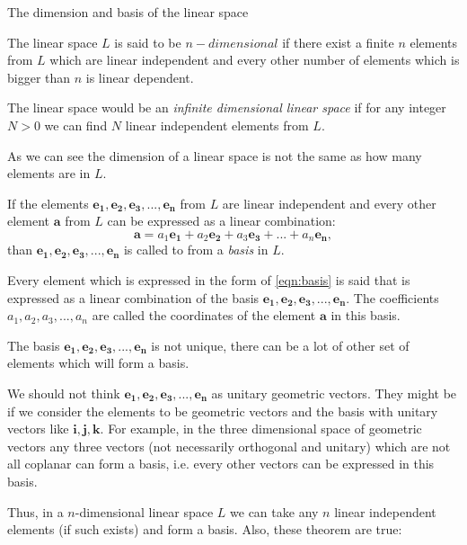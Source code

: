 \documentclass{book}
\begin{document}
\begin{section}{The dimension and basis of the linear space}

The linear space $L$ is said to be $n-dimensional$ if there exist a finite $n$ elements from $L$ which are linear independent and every other number of elements which is bigger than $n$ is linear dependent.

The linear space would be an \emph{infinite dimensional linear space} if for any integer $N > 0$ we can find $N$ linear independent elements from $L$.

As we can see the dimension of a linear space is not the same as how many elements are in $L$.

If the elements $\boldsymbol{e_1}, \boldsymbol{e_2}, \boldsymbol{e_3}, ..., \boldsymbol{e_n}$ from $L$ are linear independent and every other element $\boldsymbol{a}$ from $L$ can be expressed as a linear combination: 
\begin{equation}
\label{eqn:basis}
\boldsymbol{a} = a_1\boldsymbol{e_1} + a_2\boldsymbol{e_2} + a_3\boldsymbol{e_3} + ... + a_n\boldsymbol{e_n},
\end{equation}
than $\boldsymbol{e_1}, \boldsymbol{e_2}, \boldsymbol{e_3}, ..., \boldsymbol{e_n}$ is called to from a \emph{basis} in $L$.

Every element which is expressed in the form of \ref{eqn:basis} is said that is expressed as a linear combination of the basis $\boldsymbol{e_1}, \boldsymbol{e_2}, \boldsymbol{e_3}, ..., \boldsymbol{e_n}$. The coefficients $a_1, a_2, a_3,..., a_n$ are called the coordinates of the element $\boldsymbol{a}$ in this basis.

The basis $\boldsymbol{e_1}, \boldsymbol{e_2}, \boldsymbol{e_3}, ..., \boldsymbol{e_n}$ is not unique, there can be a lot of other set of elements which will form a basis.

We should not think $\boldsymbol{e_1}, \boldsymbol{e_2}, \boldsymbol{e_3}, ..., \boldsymbol{e_n}$ as unitary geometric vectors. They might be if we consider the elements to be geometric vectors and the basis with unitary vectors like $\boldsymbol{i}, \boldsymbol{j}, \boldsymbol{k}$. For example, in the three dimensional space of geometric vectors any three vectors (not necessarily orthogonal and unitary) which are not all coplanar can form a basis, i.e. every other vectors can be expressed in this basis.

Thus, in a $n$-dimensional linear space $L$ we can take any $n$ linear independent elements (if such exists) and form a basis. Also, these theorem are true:


\end{section}
\end{document}
